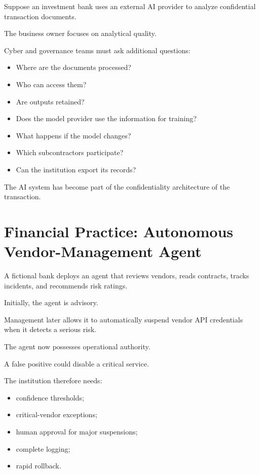 Suppose an investment bank uses an external AI provider to analyze confidential transaction documents.

The business owner focuses on analytical quality.

Cyber and governance teams must ask additional questions:

\begin{itemize}
    \item Where are the documents processed?
    \item Who can access them?
    \item Are outputs retained?
    \item Does the model provider use the information for training?
    \item What happens if the model changes?
    \item Which subcontractors participate?
    \item Can the institution export its records?
\end{itemize}

The AI system has become part of the confidentiality architecture of the transaction.

\section{Financial Practice: Autonomous Vendor-Management Agent}

A fictional bank deploys an agent that reviews vendors, reads contracts, tracks incidents, and recommends risk ratings.

Initially, the agent is advisory.

Management later allows it to automatically suspend vendor API credentials when it detects a serious risk.

The agent now possesses operational authority.

A false positive could disable a critical service.

The institution therefore needs:

\begin{itemize}
    \item confidence thresholds;
    \item critical-vendor exceptions;
    \item human approval for major suspensions;
    \item complete logging;
    \item rapid rollback.
\end{itemize}

